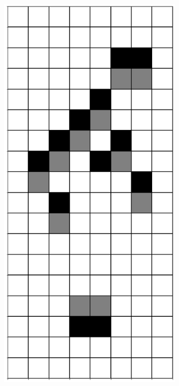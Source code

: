 \documentclass[12pt]{article}
\numberwithin{figure}{section} %
\begin{document}
\begin{figure}[H]
\begin{subfigure}{0.19\textwidth}
     \subcaption{}
   \end{subfigure}
           \begin{subfigure}{0.19\textwidth}
     \centering
     \includegraphics[width=\linewidth]{Section4/27.3}

\end{subfigure}
\end{figure}
\end{document}
